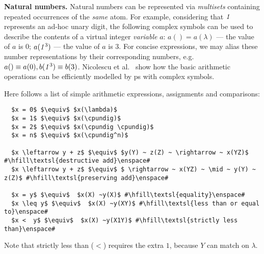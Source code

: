 \medskip
\noindent
\textbf{Natural numbers.} Natural numbers can be represented via \emph{multisets} containing repeated occurrences of the \emph{same} atom.
For example, considering that $\mathit{1}$ represents an ad-hoc unary digit, 
the following complex symbols can be used to describe 
the contents of a virtual integer \emph{variable} $a$: 
$a () = a(\lambda)$ --- the value of $a$ is 0;
$a(\mathit{1}^3)$ --- the value of $a$ is 3.
For concise expressions, we may alias these number representations by their corresponding numbers, e.g.~$a() \equiv a(0), b(\mathit{1}^3) \equiv b(3)$.
Nicolescu et al.~\cite{Nicolescu2014,RN-HW-ROMJIST14} show how the basic arithmetic operations can be efficiently modelled by \gls{ps} with complex symbols.

Here follows a list of simple arithmetic expressions, assignments and comparisons:

\lstset{xleftmargin=.5in, xrightmargin=.5in} 
\begin{lstlisting}
  $x = 0$ $\equiv$ $x(\lambda)$
  $x = 1$ $\equiv$ $x(\cpundig)$
  $x = 2$ $\equiv$ $x(\cpundig \cpundig)$
  $x = n$ $\equiv$ $x(\cpundig^n)$
  
  $x \leftarrow y + z$ $\equiv$ $y(Y) ~ z(Z) ~ \rightarrow ~ x(YZ)$ #\hfill\textsl{destructive add}\enspace#
  $x \leftarrow y + z$ $\equiv$ $ \rightarrow ~ x(YZ) ~ \mid ~ y(Y) ~ z(Z)$ #\hfill\textsl{preserving add}\enspace#
  
  $x = y$ $\equiv$  $x(X) ~y(X)$ #\hfill\textsl{equality}\enspace#
  $x \leq y$ $\equiv$  $x(X) ~y(XY)$ #\hfill\textsl{less than or equal to}\enspace#
  $x <  y$ $\equiv$  $x(X) ~y(X1Y)$ #\hfill\textsl{strictly less than}\enspace#
\end{lstlisting}

Note that strictly less than (\(<\)) requires the extra \(1\), because \(Y\) can match on \(\lambda\).


